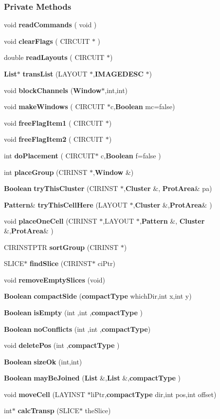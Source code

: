 \subsubsection*{Private Methods}
\begin{CompactItemize}
\item 
void {\bf read\-Commands} ( void )
\item 
void {\bf clear\-Flags} ( CIRCUIT $\ast$ )
\item 
double {\bf read\-Layouts} ( CIRCUIT $\ast$)
\item 
{\bf List}$\ast$ {\bf trans\-List} (LAYOUT $\ast$,{\bf IMAGEDESC} $\ast$)
\item 
void {\bf block\-Channels} ({\bf Window}$\ast$,int,int)
\item 
void {\bf make\-Windows} ( CIRCUIT $\ast$c,{\bf Boolean} mc=false)
\item 
void {\bf free\-Flag\-Item1} ( CIRCUIT $\ast$)
\item 
void {\bf free\-Flag\-Item2} ( CIRCUIT $\ast$)
\item 
int {\bf do\-Placement} ( CIRCUIT$\ast$ c,{\bf Boolean} f=false )
\item 
int {\bf place\-Group} (CIRINST $\ast$,{\bf Window} \&)
\item 
{\bf Boolean} {\bf try\-This\-Cluster} (CIRINST $\ast$,{\bf Cluster} \&, {\bf Prot\-Area}\& pa)
\item 
{\bf Pattern}\& {\bf try\-This\-Cell\-Here} (LAYOUT $\ast$,{\bf Cluster} \&,{\bf Prot\-Area}\& )
\item 
void {\bf place\-One\-Cell} (CIRINST $\ast$,LAYOUT $\ast$,{\bf Pattern} \&, {\bf Cluster} \&,{\bf Prot\-Area}\& )
\item 
CIRINSTPTR {\bf sort\-Group} (CIRINST $\ast$)
\item 
SLICE$\ast$ {\bf find\-Slice} (CIRINST$\ast$ ci\-Ptr)
\item 
void {\bf remove\-Empty\-Slices} (void)
\item 
{\bf Boolean} {\bf compact\-Side} ({\bf compact\-Type} which\-Dir,int x,int y)
\item 
{\bf Boolean} {\bf is\-Empty} (int ,int ,{\bf compact\-Type} )
\item 
{\bf Boolean} {\bf no\-Conflicts} (int ,int ,{\bf compact\-Type})
\item 
void {\bf delete\-Pos} (int ,{\bf compact\-Type} )
\item 
{\bf Boolean} {\bf size\-Ok} (int,int)
\item 
{\bf Boolean} {\bf may\-Be\-Joined} ({\bf List} \&,{\bf List} \&,{\bf compact\-Type} )
\item 
void {\bf move\-Cell} (LAYINST $\ast$li\-Ptr,{\bf compact\-Type} dir,int pos,int offset)
\item 
int$\ast$ {\bf calc\-Transp} (SLICE$\ast$ the\-Slice)
\end{CompactItemize}
